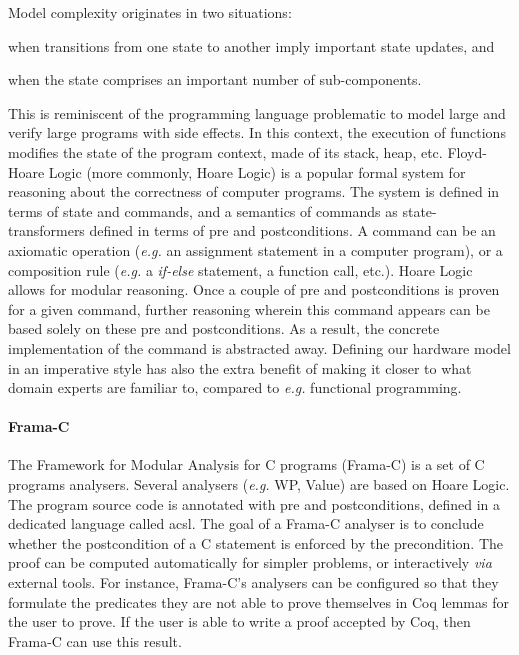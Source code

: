 Model complexity originates in two situations:
%
\begin{inparaenum}[(1)]
\item when transitions from one state to another imply important state updates,
  and
%
\item when the state comprises an important number of sub-components.
%
\end{inparaenum}
%
This is reminiscent of the programming language problematic to model large and
verify large programs with side effects.
%
In this context, the execution of functions modifies the state of the program
context, made of its stack, heap, etc.
%
Floyd-Hoare Logic (more commonly, Hoare Logic) is a popular formal system for
reasoning about the correctness of computer programs.
%
The system is defined in terms of state and commands, and a semantics of
commands as state-transformers defined in terms of pre and postconditions.
%
A command can be an axiomatic operation (\emph{e.g.} an assignment statement in
a computer program), or a composition rule (\emph{e.g.} a \emph{if-else}
statement, a function call, etc.).
%
Hoare Logic allows for modular reasoning.
%
Once a couple of pre and postconditions is proven for a given command, further
reasoning wherein this command appears can be based solely on these pre and postconditions.
%
As a result, the concrete implementation of the command is abstracted away.
%
Defining our hardware model in an imperative style has also the extra benefit of
making it closer to what domain experts are familiar to, compared to
\emph{e.g.} functional programming.

\paragraph{Frama-C}
%
The Framework for Modular Analysis for C programs (Frama-C) is a set of C
programs analysers.
%
Several analysers (\emph{e.g.} WP, Value) are based on Hoare Logic.
%
The program source code is annotated with pre and postconditions, defined in a
dedicated language called \ac{acsl}.
%
The goal of a Frama-C analyser is to conclude whether the postcondition of a C
statement is enforced by the precondition.
%
The proof can be computed automatically for simpler problems, or interactively
\emph{via} external tools.
%
For instance, Frama-C's analysers can be configured so that they formulate the
predicates they are not able to prove themselves in Coq lemmas for the user to
prove.
%
If the user is able to write a proof accepted by Coq, then Frama-C can use this
result.

